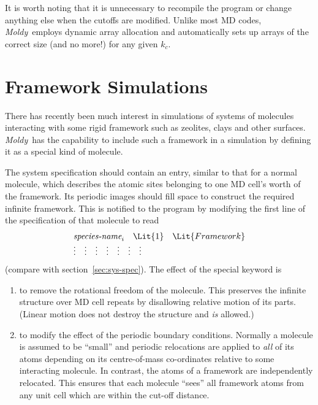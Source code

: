 \documentclass[a4paper,twoside]{report}
\newcommand{\moldy}{\emph{Moldy}}
\begin{document}
It is worth noting that it is unnecessary to recompile the program or
change anything else when the cutoffs are modified. Unlike most MD
codes, \moldy\ employs dynamic array allocation and automatically sets
up arrays of the correct size (and no more!) for any given $k_{c}$.

\section{Framework Simulations}%

There has recently been much interest in simulations of systems of
molecules interacting with some rigid framework such as zeolites,
clays and other surfaces.  \moldy\  has the capability to include such a
framework in a simulation by defining it as a special kind of molecule.

The system specification should contain an entry, similar to that for
a normal molecule, which describes the atomic sites belonging to one
MD cell's worth of the framework.  Its periodic images should fill
space to construct the required infinite framework.  This is notified
to the program by modifying the first line of the specification of
that molecule to read
\begin{displaymath}
\begin{array}{lllllll}
\multicolumn{7}{l}{\textit{species-name}_{i} %
                  \quad \Lit{1} \quad \Lit{Framework}}  \\
\vdots & \vdots & \vdots & \vdots & \vdots & \vdots & \vdots \\
\end{array}
\end{displaymath}
(compare with section~\ref{sec:sys-spec}).  The effect of the special
keyword  is
\begin{enumerate}
\item to remove the rotational freedom of the molecule.  This
preserves the infinite structure over MD cell repeats by disallowing
relative motion of its parts. (Linear motion does not destroy the
structure and \emph{is} allowed.)
\item to modify the effect of the periodic boundary conditions.
Normally a molecule is assumed to be ``small'' and periodic relocations
are applied to \emph{all} of its atoms depending on its centre-of-mass
co-ordinates relative to some interacting molecule.  In contrast, the
atoms of a framework are independently relocated.  This ensures that
each molecule ``sees'' all framework atoms from any unit cell which
are within the cut-off distance.
\end{enumerate}
\end{document}

